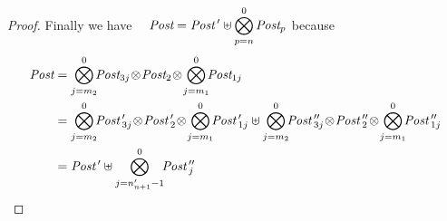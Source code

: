 \documentclass{lmcs}
\newcommand{\shortotimes}{\!\otimes\!}
\begin{document}
\begin{proof}
Finally we have~~
$\Post=\displaystyle{\Post\,' \uplus \bigotimes_{p=n}^0
		\Post_p}$\quad
because
{\small \begin{align*}
\Post&=\bigotimes_{j=m_2}^{0}\!\!\Post_{3j}\shortotimes\Post_2\shortotimes\bigotimes_{j=m_1}^{0}\!\!\Post_{1j}\\
&=\bigotimes_{j=m_2}^{0}\!\!\Post\,'_{3j}\shortotimes\Post\,'_2\shortotimes\bigotimes_{j=m_1}^{0}\!\!\Post\,'_{1j} \uplus \bigotimes_{j=m_2}^{0}\!\!\Post\,''_{3j}\shortotimes\Post\,''_2\shortotimes\bigotimes_{j=m_1}^{0}\!\!\Post\,''_{1j}\\
&=\Post\,' \uplus \bigotimes_{j=n'_{n+1}-1}^{0}\!\!\Post\,''_{j}\qedhere
\end{align*}}
%
%

\end{proof}
\end{document}
